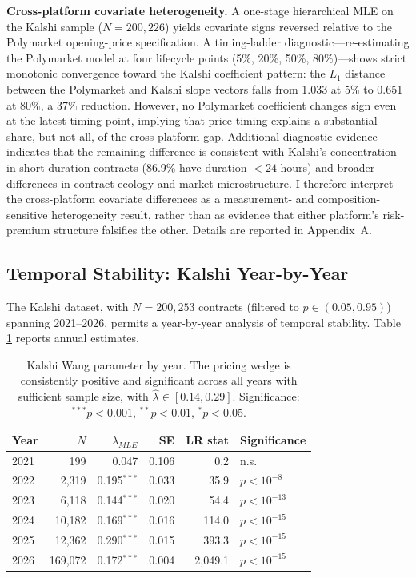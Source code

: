 \documentclass[12pt,a4paper]{article}
\begin{document}
\textbf{Cross-platform covariate heterogeneity.} A one-stage
hierarchical MLE on the Kalshi sample (\(N = 200{,}226\)) yields
covariate signs reversed relative to the Polymarket opening-price
specification. A timing-ladder diagnostic---re-estimating the Polymarket
model at four lifecycle points (5\%, 20\%, 50\%, 80\%)---shows strict
monotonic convergence toward the Kalshi coefficient pattern: the \(L_1\)
distance between the Polymarket and Kalshi slope vectors falls from
1.033 at 5\% to 0.651 at 80\%, a 37\% reduction. However, no Polymarket
coefficient changes sign even at the latest timing point, implying that
price timing explains a substantial share, but not all, of the
cross-platform gap. Additional diagnostic evidence indicates that the
remaining difference is consistent with Kalshi's concentration in
short-duration contracts (86.9\% have duration \(< 24\) hours) and
broader differences in contract ecology and market microstructure. I
therefore interpret the cross-platform covariate differences as a
measurement- and composition-sensitive heterogeneity result, rather than
as evidence that either platform's risk-premium structure falsifies the
other. Details are reported in Appendix~A.

\subsection{Temporal Stability: Kalshi
Year-by-Year}\label{temporal-stability-kalshi-year-by-year}

The Kalshi dataset, with \(N = 200{,}253\) contracts (filtered to
\(p \in (0.05, 0.95)\)) spanning 2021--2026, permits a year-by-year
analysis of temporal stability. Table \ref{tab:kalshi_temporal} reports
annual estimates.

\begin{table}[H]
\centering
\small
\caption{Kalshi Wang parameter by year. The pricing wedge is consistently positive and significant across all years with sufficient sample size, with $\hat{\lambda} \in [0.14, 0.29]$. Significance: $^{***}p<0.001$, $^{**}p<0.01$, $^{*}p<0.05$.}
\label{tab:kalshi_temporal}
\begin{tabular}{lrrrrl}
\toprule
Year & $N$ & $\hat{\lambda}_{MLE}$ & SE & LR stat & Significance \\
\midrule
2021 & 199 & 0.047 & 0.106 & 0.2 & n.s. \\
2022 & 2,319 & 0.195$^{***}$ & 0.033 & 35.9 & $p < 10^{-8}$ \\
2023 & 6,118 & 0.144$^{***}$ & 0.020 & 54.4 & $p < 10^{-13}$ \\
2024 & 10,182 & 0.169$^{***}$ & 0.016 & 114.0 & $p < 10^{-15}$ \\
2025 & 12,362 & 0.290$^{***}$ & 0.015 & 393.3 & $p < 10^{-15}$ \\
2026 & 169,072 & 0.172$^{***}$ & 0.004 & 2,049.1 & $p < 10^{-15}$ \\
\bottomrule
\end{tabular}
\end{table}
\end{document}
